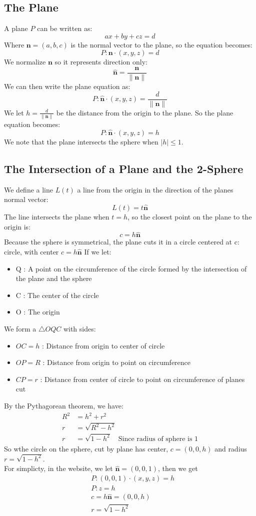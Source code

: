 \documentclass[9pt]{extarticle}
\begin{document}
\subsection{The Plane}
A plane $P$ can be written as:
$$ax + by + cz = d$$
Where $\textbf{n} = (a,b,c)$ is the normal vector to the plane, so the equation becomes:
$$P : \textbf{n} \cdot (x,y,z) = d$$
We normalize $\textbf{n}$ so it represents direction only:
$$\hat{\textbf{n}} = \frac{\textbf{n}}{\|\textbf{n}\|}$$
We can then write the plane equation as:
$$P : \hat{\textbf{n}} \cdot (x,y,z) = \frac{d}{\|\textbf{n}\|}$$
We let $h = \frac{d}{\|\textbf{n}\|}$ be the distance from the origin to the plane.
So the plane equation becomes:
$$P : \hat{\textbf{n}} \cdot (x,y,z) = h$$
We note that the plane intersects the sphere when $|h| \leq 1$.
\subsection{The Intersection of a Plane and the 2-Sphere}
We define a line $L(t)$ a line from the origin in the direction of the planes normal vector:
$$L(t) = t \hat{\textbf{n}}$$
The line intersects the plane when $t= h$, so the closest point on the plane to the origin is:
$$c = h \hat{\textbf{n}}$$
Because the sphere is symmetrical, the plane cuts it in a circle centered at c:
circle, with center $c = h \hat{\textbf{n}}$
If we let:
\begin{itemize}
    \item Q : A point on the circumference of the circle formed by the intersection of the plane and the sphere
    \item C : The center of the circle
    \item O : The origin
\end{itemize}
We form a $\triangle OQC$ with sides:
\begin{itemize}
    \item $OC = h$ : Distance from origin to center of circle
    \item $OP = R$ : Distance from origin to point on circumference
    \item $CP = r$ : Distance from center of circle to point on circumference of planes cut
\end{itemize}
By the Pythagorean theorem, we have:
\begin{align*}
    R^2 & = h^2 + r^2                                               \\
    r   & = \sqrt{R^2 - h^2}                                        \\
    r   & = \sqrt{1 - h^2} \quad \text{Since radius of sphere is 1}
\end{align*}
So wthe circle on the sphere, cut by plane has center, $c = (0,0,h)$ and radius $r = \sqrt{1 - h^2}$. \\
For simplicty, in the website, we let $\hat{\textbf{n}} = (0,0,1)$, then we get
\begin{align*}
     & P : (0,0,1) \cdot (x,y,z) = h    \\
     & P : z = h                        \\[1ex]
     & c = h \hat{\textbf{n}} = (0,0,h) \\
     & r = \sqrt{1 - h^2}
\end{align*}
\end{document}
